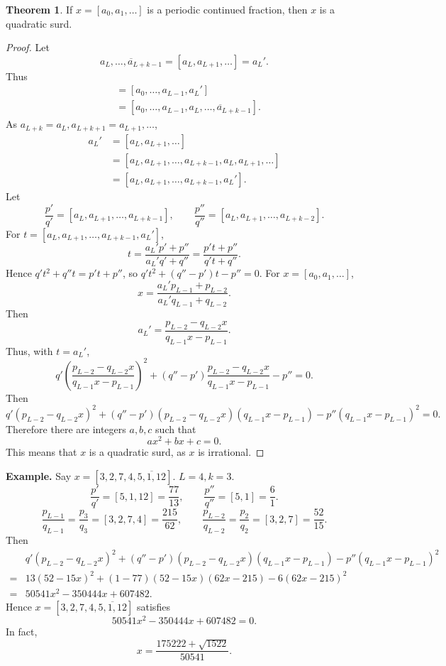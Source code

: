 \documentclass{article}
\theoremstyle{definition}
\newtheorem{theorem}{Theorem}
\theoremstyle{definition}
\begin{document}
\begin{theorem}
If $x=[a_0,a_1,\ldots]$ is a periodic continued fraction, then $x$ is a quadratic surd.
\end{theorem}
\begin{proof}
Let
\[
\overline{a_L,\ldots,a_{L+k-1}} = [a_L,a_{L+1},\ldots] = a_L'.
\]
Thus
\begin{align*}
[a_0,\ldots,a_{L-1},a_L,a_{L+1},\ldots]
&=[a_0,\ldots,a_{L-1},a_L']\\
&=[a_0,\ldots,a_{L-1},\overline{a_L,\ldots,a_{L+k-1}}].
\end{align*}
As $a_{L+k}=a_L,a_{L+k+1}=a_{L+1},\ldots$, 
\begin{align*}
a_L'& = [a_L,a_{L+1},\ldots]\\
&=  [a_L,a_{L+1},\ldots,a_{L+k-1},a_L,a_{L+1},\ldots]\\
&=[a_L,a_{L+1},\ldots,a_{L+k-1},a_L'].
\end{align*}
Let
\[
\frac{p'}{q'} = [a_L,a_{L+1},\ldots,a_{L+k-1}],
\qquad 
\frac{p''}{q''} = [a_L,a_{L+1},\ldots,a_{L+k-2}].
\]
For $t=[a_L,a_{L+1},\ldots,a_{L+k-1},a_L']$, 
\[
t = \frac{a_L'p'+p''}{a_L'q'+q''} = \frac{p't+p''}{q't+q''}.
\]
Hence $q't^2+q''t=p't+p''$, so $q't^2 + (q''-p')t - p''=0$.
For $x=[a_0,a_1,\ldots]$,
\[
x = \frac{a_L'p_{L-1}+p_{L-2}}{a_L'q_{L-1}+q_{L-2}}.
\]
Then
\[
a_L' = \frac{p_{L-2}-q_{L-2}x}{q_{L-1}x-p_{L-1}}.
\]
Thus, with $t=a_L'$,
\[
q' \left(\frac{p_{L-2}-q_{L-2}x}{q_{L-1}x-p_{L-1}}\right)^2 + (q''-p') \frac{p_{L-2}-q_{L-2}x}{q_{L-1}x-p_{L-1}}
-p''=0.
\]
Then
\[
q'(p_{L-2}-q_{L-2}x)^2 + (q''-p') (p_{L-2}-q_{L-2}x)(q_{L-1}x-p_{L-1})
-p''(q_{L-1}x-p_{L-1})^2=0.
\]
Therefore there are integers $a,b,c$ such that
\[
ax^2+bx+c=0.
\]
This means that $x$ is a quadratic surd, as $x$ is irrational.
\end{proof}


\textbf{Example.} Say $x=[3,2,7,4,\overline{5,1,12}]$.
$L=4, k=3$. 
\[
\frac{p'}{q'} = [5,1,12] = \frac{77}{13},
\qquad \frac{p''}{q''} = [5,1] = \frac{6}{1}.
\]
\[
\frac{p_{L-1}}{q_{L-1}}=\frac{p_3}{q_3} =[3,2,7,4] =\frac{215}{62},
\qquad 
\frac{p_{L-2}}{q_{L-2}} = \frac{p_2}{q_2} = [3,2,7] = \frac{52}{15}.
\]
Then
\begin{align*}
&q'(p_{L-2}-q_{L-2}x)^2 + (q''-p') (p_{L-2}-q_{L-2}x)(q_{L-1}x-p_{L-1})
-p''(q_{L-1}x-p_{L-1})^2\\
=&13(52 - 15x)^2+(1-77)(52-15x)(62x-215)-6(62x-215)^2\\
=&50541x^2-350444x+607482.
\end{align*}
Hence $x=[3,2,7,4,\overline{5,1,12}]$ satisfies
\[
50541x^2-350444x+607482=0.
\]
In fact, 
\[
x=\frac{175222+\sqrt{1522}}{50541}.
\]
\end{document}

